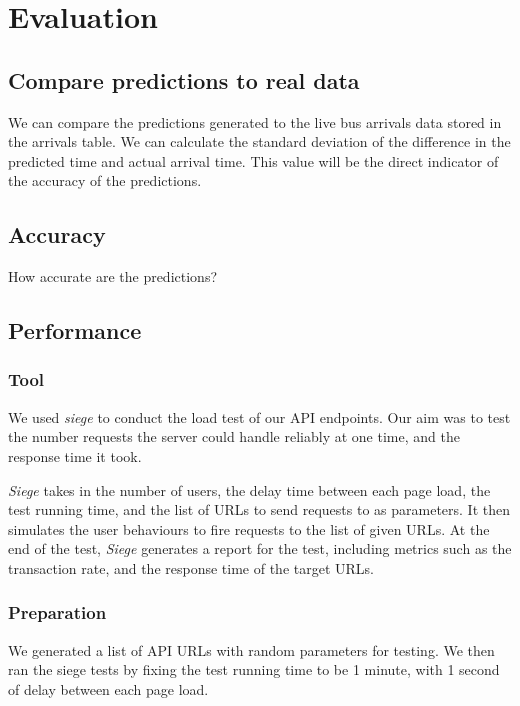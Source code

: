 \chapter{Evaluation}

\section{Compare predictions to real data}
We can compare the predictions generated to the live bus arrivals data stored in the arrivals table. We can calculate the standard deviation of the difference in the predicted time and actual arrival time. This value will be the direct indicator of the accuracy of the predictions.

\section{Accuracy}
How accurate are the predictions?


\section{Performance}
\subsection{Tool}
\par We used \textit{siege}\cite{siege} to conduct the load test of our API endpoints. Our aim was to test the number requests the server could handle reliably at one time, and the response time it took.

\par \textit{Siege} takes in the number of users, the delay time between each page load, the test running time, and the list of URLs to send requests to as parameters. It then simulates the user behaviours to fire requests to the list of given URLs. At the end of the test, \textit{Siege} generates a report for the test, including metrics such as the transaction rate, and the response time of the target URLs.

\subsection{Preparation}
\par We generated a list of API URLs with random parameters for testing. We then ran the siege tests by fixing the test running time to be 1 minute, with 1 second of delay between each page load.

